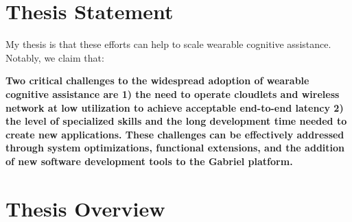 
\section{Thesis Statement}

My thesis is that these efforts can help to scale wearable cognitive assistance.
Notably, we claim that:

\textbf{Two critical challenges to the widespread adoption of wearable cognitive
  assistance are 1) the need to operate cloudlets and wireless network at low
  utilization to achieve acceptable end-to-end latency 2) the level of specialized
  skills and the long development time needed to create new applications. These
  challenges can be effectively addressed through system optimizations,
  functional extensions, and the addition of new software development tools to
  the Gabriel platform.}

\section{Thesis Overview}

